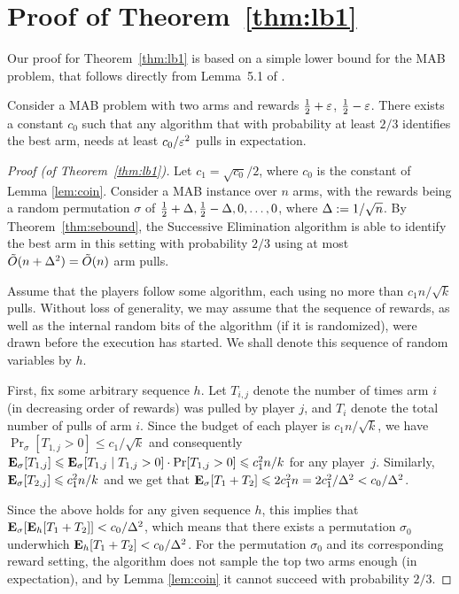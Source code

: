 \documentclass{article}
\begin{document}
\section{Proof of Theorem~\ref{thm:lb1}}

Our proof for Theorem~\ref{thm:lb1} is based on a simple lower bound for the MAB problem, that follows directly from Lemma~5.1 of \cite{anthony1999neural}. 

\begin{lemma} \label{lem:coin}
Consider a MAB problem with two arms and rewards $\frac{1}{2} + \varepsilon$, $\frac{1}{2} - \varepsilon$.
There exists a constant $c_0$ such that any algorithm that with probability at least $2/3$ identifies the best arm, needs at least $c_0 /\varepsilon^2$ pulls in expectation.
\end{lemma}



\begin{proof}[Proof (of Theorem~\ref{thm:lb1})]
Let $c_1 = \sqrt{c_0}/2$, where $c_0$ is the constant of Lemma \ref{lem:coin}.
Consider a MAB instance over $n$ arms, with the rewards being a random
permutation $\sigma$ of $\frac{1}{2} + \Delta, \frac{1}{2} - \Delta, 0, \ldots, 0$, where $\Delta := 1/\sqrt{n}$.
By Theorem~\ref{thm:sebound}, the Successive Elimination algorithm is able to identify the best arm in this setting with probability $2/3$ using at most $\tilde{O}(n + \Delta^2) = \tilde{O}(n)$ arm pulls.

Assume that the players follow some algorithm, each using no more than $c_1 n/\sqrt{k}$ pulls. Without loss of generality, we may assume that the sequence of rewards, as well as the internal random bits of the algorithm (if it is randomized), were drawn before the execution has started. We shall denote this sequence of random variables by $h$.

First, fix some arbitrary sequence $h$. Let $T_{i,j}$ denote the number of times arm $i$ (in decreasing order of rewards) was pulled by player $j$, and $T_i$ denote the total number of pulls of arm $i$.
Since the budget of each player is $c_1 n/\sqrt{k}$, we have $\Pr_\sigma[T_{1,j} > 0] \le c_1 / \sqrt{k}$ and consequently
$
	\mathbf{E}_\sigma[T_{1,j}]
	\leqslant \mathbf{E}_\sigma[T_{1,j} \mid T_{1,j} > 0] \cdot \Pr[T_{1,j} > 0]
	\leqslant c_1^2 n/k
$
for any player~$j$.
Similarly, $\mathbf{E}_\sigma[T_{2,j}] \leqslant c_1^2 n/k$ and we get that $\mathbf{E}_\sigma[T_1 + T_2] \leqslant 2 c_1^2 n = 2 c_1^2 / \Delta^2 < c_0 / \Delta^2$.

Since the above holds for any given sequence $h$, this implies that $\mathbf{E}_\sigma[\mathbf{E}_h[T_1 + T_2]] < c_0 / \Delta^2$, which means that there exists a permutation $\sigma_0$ underwhich $\mathbf{E}_h[T_1 + T_2] < c_0 / \Delta^2$.
For the permutation $\sigma_0$ and its corresponding reward setting, the algorithm does not sample the top two arms enough (in expectation), and by Lemma \ref{lem:coin} it cannot succeed with probability $2/3$.
\end{proof}


\fi
\end{document}
